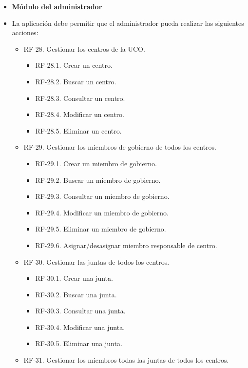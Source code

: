 \begin{itemize}
 \item \textbf{Módulo del administrador}
 \item[] La aplicación debe permitir que el administrador pueda realizar las siguientes acciones:
     \begin{itemize}
        \item RF-28. Gestionar los centros de la UCO.
             \begin{itemize}
                  \item RF-28.1. Crear un centro.
                  \item RF-28.2. Buscar un centro.
                  \item RF-28.3. Consultar un centro.
                  \item RF-28.4. Modificar un centro.
                  \item RF-28.5. Eliminar un centro.
             \end{itemize} 
        \item RF-29. Gestionar los miembros de gobierno de todos los centros.
             \begin{itemize}
                  \item RF-29.1. Crear un miembro de gobierno.
                  \item RF-29.2. Buscar un miembro de gobierno.
                  \item RF-29.3. Consultar un miembro de gobierno.
                  \item RF-29.4. Modificar un miembro de gobierno.
                  \item RF-29.5. Eliminar un miembro de gobierno.
                 \item RF-29.6. Asignar/desasignar miembro responsable de centro.
             \end{itemize} 
         \item RF-30. Gestionar las juntas de todos los centros.
             \begin{itemize}
                  \item RF-30.1. Crear una junta.
                  \item RF-30.2. Buscar una junta.
                  \item RF-30.3. Consultar una junta.
                  \item RF-30.4. Modificar una junta.
                  \item RF-30.5. Eliminar una junta.
             \end{itemize} 
        \item RF-31. Gestionar los miembros todas las juntas de todos los centros.

\end{itemize}
\end{itemize}
